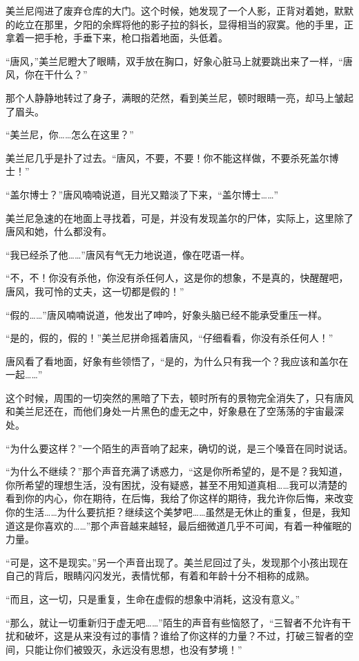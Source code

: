 美兰尼闯进了废弃仓库的大门。这个时候，她发现了一个人影，正背对着她，默默的屹立在那里，夕阳的余辉将他的影子拉的斜长，显得相当的寂寞。他的手里，正拿着一把手枪，手垂下来，枪口指着地面，头低着。 

“唐风，”美兰尼瞪大了眼睛，双手放在胸口，好象心脏马上就要跳出来了一样，“唐风，你在干什么？” 

那个人静静地转过了身子，满眼的茫然，看到美兰尼，顿时眼睛一亮，却马上皱起了眉头。 

“美兰尼，你……怎么在这里？” 

美兰尼几乎是扑了过去。“唐风，不要，不要！你不能这样做，不要杀死盖尔博士！” 

“盖尔博士？”唐风喃喃说道，目光又黯淡了下来，“盖尔博士……” 

美兰尼急速的在地面上寻找着，可是，并没有发现盖尔的尸体，实际上，这里除了唐风和她，什么都没有。 

“我已经杀了他……”唐风有气无力地说道，像在呓语一样。 

“不，不！你没有杀他，你没有杀任何人，这是你的想象，不是真的，快醒醒吧，唐风，我可怜的丈夫，这一切都是假的！” 

“假的……”唐风喃喃说道，他发出了呻吟，好象头脑已经不能承受重压一样。 

“是的，假的，假的！”美兰尼拼命摇着唐风，“仔细看看，你没有杀任何人！” 

唐风看了看地面，好象有些领悟了，“是的，为什么只有我一个？我应该和盖尔在一起……” 

这个时候，周围的一切突然的黑暗了下去，顿时所有的景物完全消失了，只有唐风和美兰尼还在，而他们身处一片黑色的虚无之中，好象悬在了空荡荡的宇宙最深处。 

“为什么要这样？”一个陌生的声音响了起来，确切的说，是三个嗓音在同时说话。 

“为什么不继续？”那个声音充满了诱惑力，“这是你所希望的，是不是？我知道，你所希望的理想生活，没有困扰，没有疑惑，甚至不用知道真相……我可以清楚的看到你的内心，你在期待，在后悔，我给了你这样的期待，我允许你后悔，来改变你的生活……为什么要抗拒？继续这个美梦吧……虽然是无休止的重复，但是，我知道这是你喜欢的……”那个声音越来越轻，最后细微道几乎不可闻，有着一种催眠的力量。 

“可是，这不是现实。”另一个声音出现了。美兰尼回过了头，发现那个小孩出现在自己的背后，眼睛闪闪发光，表情忧郁，有着和年龄十分不相称的成熟。 

“而且，这一切，只是重复，生命在虚假的想象中消耗，这没有意义。” 

“那么，就让一切重新归于虚无吧……”陌生的声音有些恼怒了，“三智者不允许有干扰和破坏，这是从来没有过的事情？谁给了你这样的力量？不过，打破三智者的空间，只能让你们被毁灭，永远没有思想，也没有梦境！” 

